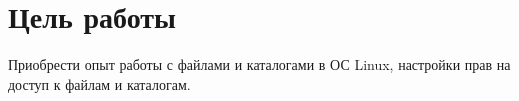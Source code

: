 \thispagestyle{empty}
\section*{Цель работы}

Приобрести опыт работы с файлами и каталогами в ОС Linux, настройки прав на доступ к файлам и каталогам. 